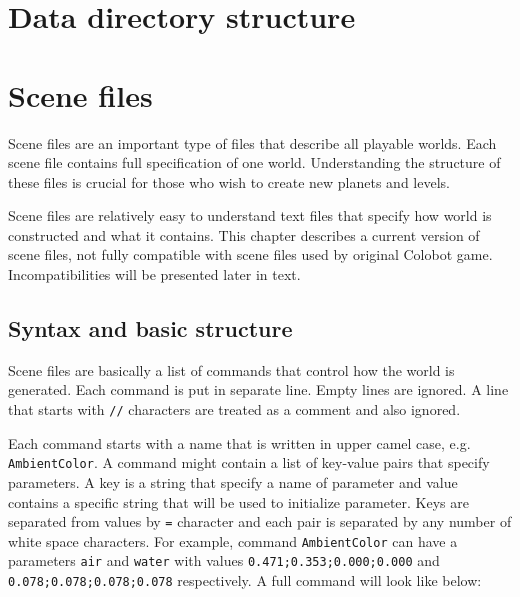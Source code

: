 \chapter{Data directory structure}


\chapter{Scene files}

Scene files are an important type of files that describe all playable worlds. Each scene file contains full specification of one world. Understanding the structure of these files is crucial for those who wish to create new planets and levels.

Scene files are relatively easy to understand text files that specify how world is constructed and what it contains. This chapter describes a current version of scene files, not fully compatible with scene files used by original Colobot game. Incompatibilities will be presented later in text.


\section{Syntax and basic structure}


Scene files are basically a list of commands that control how the world is generated. Each command is put in separate line. Empty lines are ignored. A line that starts with \verb|//| characters are treated as a comment and also ignored.

Each command starts with a name that is written in upper camel case, e.g. \verb|AmbientColor|. A command might contain a list of key-value pairs that specify parameters. A key is a string that specify a name of parameter and value contains a specific string that will be used to initialize parameter. Keys are separated from values by \verb|=| character and each pair is separated by any number of white space characters. For example, command \verb|AmbientColor| can have a parameters \verb|air| and \verb|water| with values \verb|0.471;0.353;0.000;0.000| and \verb|0.078;0.078;0.078;0.078| respectively. A full command will look like below:

